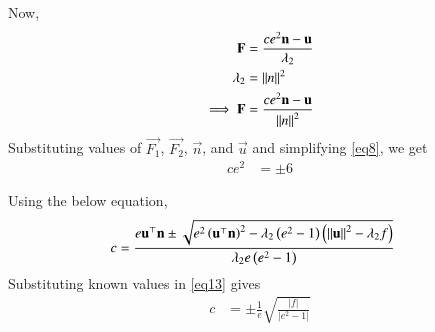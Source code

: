 \documentclass[journal]{IEEEtran}
\begin{document}
Now, 
\begin{align}
	\mathbf{F}&=\frac{ce^2\mathbf{n}-\mathbf{u}}{\lambda_2}\\ \lambda_2&=\left\lVert n\right\rVert^2\\
\implies\mathbf{F}&=\frac{ce^2\mathbf{n}-\mathbf{u}}{\left\lVert n\right\rVert^2} \label{eq8}
\end{align}
Substituting values of $\vec{F_1}$, $\vec{F_2}$, $\vec{n}$, and $\vec{u}$ and simplifying \ref{eq8}, we get
\begin{align}
 ce^2&= \pm6 \label{eq9}
\end{align}

Using the below equation, 
\begin{align}
	c&=\frac{e\mathbf{u}^\top\mathbf{n}\pm\sqrt{e^2\left(\mathbf{u}^\top\mathbf{n}\right)^2-\lambda_2\left(e^2-1\right)\left(\left\lVert\mathbf{u}\right\rVert^2-\lambda_2f\right)}}{\lambda_2e\left(e^2-1\right)} \label{eq13}
\end{align} 
Substituting known values in \eqref{eq13} gives
\begin{align}
c&=\pm\frac{1}{e}\sqrt{\frac{|f|}{|e^2-1|}} \label{eq10}
\end{align}
\end{document}
